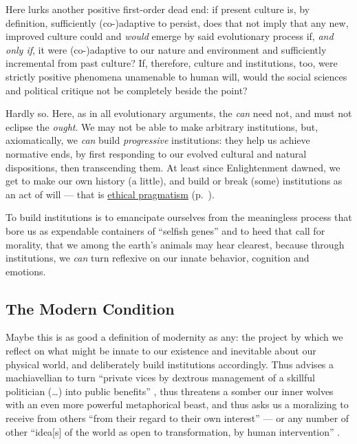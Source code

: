 Here lurks another positive first-order dead end:
if present culture is, by definition, sufficiently (co-)adaptive to persist, does that not imply that any new, improved culture could and \emph{would} emerge by said evolutionary process if, \emph{and only if}, it were (co-)adaptive to our nature and environment and sufficiently incremental from past culture?
If, therefore, culture and institutions, too, were strictly positive phenomena unamenable to human will, would the social sciences and political critique not be completely beside the point? %

Hardly so.
Here, as in all evolutionary arguments, the \emph{can} need not, and must not eclipse the \emph{ought}.
We may not be able to make arbitrary institutions, but, axiomatically, we \emph{can} build \emph{progressive} institutions:
they help us achieve normative ends, by first responding to our evolved cultural and natural dispositions, then transcending them.
At least since Enlightenment dawned, we get to make our own history (a little), and build or break (some) institutions as an act of will --- that is \hyperref[itm:pragmatic-ethics]{ethical pragmatism} (p.~\pageref{itm:pragmatic-ethics}).

To build institutions is to emancipate ourselves from the meaningless process that bore us as expendable containers of ``selfish genes'' \citep{Dawkins1976} and to heed that call for morality, that we among the earth's animals may hear clearest, because through institutions, we \emph{can} turn reflexive on our innate behavior, cognition and emotions.

\subsection[Modernity]{The Modern Condition}
	\label{sec:modernity}
Maybe this is as good a definition of modernity as any:
the project by which we reflect on what might be innate to our existence and inevitable about our physical world, and deliberately build institutions accordingly.
Thus advises a machiavellian \citeyearpar{Machiavelli1532} \citeauthor{Mandeville1714} to turn ``private vices by dextrous management of a skillful politician (\ldots) into public benefits'' \citeyearpar[213]{Mandeville1714}, thus threatens a somber \cite{Hobbes-1651-aa} our inner wolves with an even more powerful metaphorical beast, and thus asks us a moralizing \cite{Smith-1776-lq} to receive from others ``from their regard to their own interest'' --- or any number of other ``idea[s] of the world as open to transformation, by human intervention'' \citep[94]{Giddens1998}.

